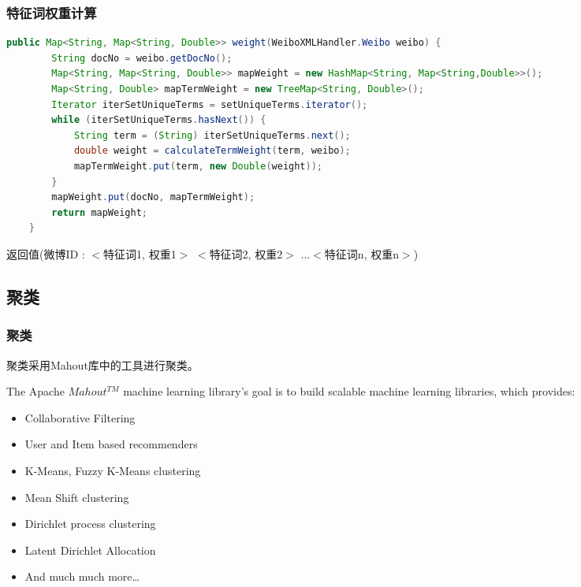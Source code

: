 \documentclass[CJKutf8, table, handout]{beamer}
\begin{document}
\begin{CJK}{UTF8}{gbsn}
\begin{frame}[fragile]
  \frametitle{特征词权重计算}
  \lstset{language=Java,basicstyle=\ttfamily,commentstyle=\ttfamily}
  \begin{tiny}
    \begin{block}{}
      \begin{lstlisting}[language=Java]
    public Map<String, Map<String, Double>> weight(WeiboXMLHandler.Weibo weibo) {
        String docNo = weibo.getDocNo();
        Map<String, Map<String, Double>> mapWeight = new HashMap<String, Map<String,Double>>();
        Map<String, Double> mapTermWeight = new TreeMap<String, Double>();
        Iterator iterSetUniqueTerms = setUniqueTerms.iterator();
        while (iterSetUniqueTerms.hasNext()) {
            String term = (String) iterSetUniqueTerms.next();
            double weight = calculateTermWeight(term, weibo);
            mapTermWeight.put(term, new Double(weight));
        }
        mapWeight.put(docNo, mapTermWeight);
        return mapWeight;
    }
      \end{lstlisting}
    \end{block}
  \end{tiny}
  \pause
  \begin{tiny}
    \begin{block}{}
      返回值(微博ID : $<$特征词1, 权重1$>$ $<$特征词2, 权重2$>$ ...$<$特征词n, 权重n$>$)
    \end{block}
  \end{tiny}
\end{frame}

\subsection{聚类}
\begin{frame}
  \frametitle{聚类}
  \begin{block}{}
    聚类采用Mahout库中的工具进行聚类。
  \end{block}
  \pause
  \begin{block}{}
    The Apache \href{http://mahout.apache.org/}{$Mahout^{TM}$} machine learning library's goal is to build scalable
    machine learning libraries\cite{Mahout}, which provides:
    \begin{center}
    \begin{itemize}
        \item Collaborative Filtering
        \item User and Item based recommenders
        \item K-Means, Fuzzy K-Means clustering
        \item Mean Shift clustering
        \item Dirichlet process clustering
        \item Latent Dirichlet Allocation
        \item And much much more\ldots
      \end{itemize}
    \end{center}
  \end{block}
  

\end{frame}
\end{CJK}
\end{document}
